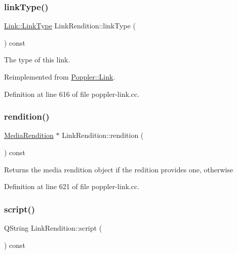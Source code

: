\subsubsection{\texorpdfstring{link\+Type()}{linkType()}}
{\footnotesize\ttfamily \hyperlink{class_poppler_1_1_link_af0dacfa77a548bb043dbae4bb9dc6c1e}{Link\+::\+Link\+Type} Link\+Rendition\+::link\+Type (\begin{DoxyParamCaption}{ }\end{DoxyParamCaption}) const\hspace{0.3cm}{\ttfamily [virtual]}}

The type of this link. 

Reimplemented from \hyperlink{class_poppler_1_1_link_a3e3ad7e8867e255c24b9a562bad596ed}{Poppler\+::\+Link}.



Definition at line 616 of file poppler-\/link.\+cc.

\mbox{\label{class_poppler_1_1_link_rendition_a907c5c1a9b88dde03bf5db1bc30ea188}} 
\subsubsection{\texorpdfstring{rendition()}{rendition()}}
{\footnotesize\ttfamily \hyperlink{class_poppler_1_1_media_rendition}{Media\+Rendition} $\ast$ Link\+Rendition\+::rendition (\begin{DoxyParamCaption}{ }\end{DoxyParamCaption}) const}

Returns the media rendition object if the redition provides one, {} otherwise 

Definition at line 621 of file poppler-\/link.\+cc.

\mbox{\label{class_poppler_1_1_link_rendition_a9dbc0f397d4a72af93c6fabe9c1c3703}} 
\subsubsection{\texorpdfstring{script()}{script()}}
{\footnotesize\ttfamily Q\+String Link\+Rendition\+::script (\begin{DoxyParamCaption}{ }\end{DoxyParamCaption}) const}

